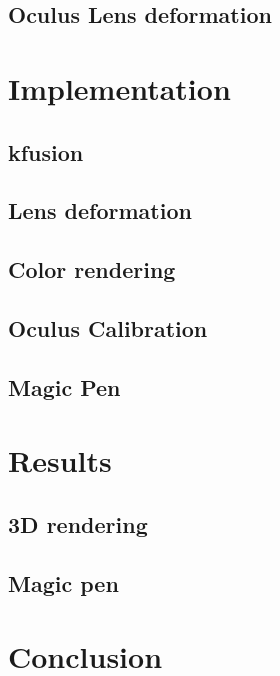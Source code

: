 \documentclass[12pt]{article}
\begin{document}
\subsection{Oculus Lens deformation}

\section{Implementation}
\subsection{kfusion}
\subsection{Lens deformation}
\subsection{Color rendering}
\subsection{Oculus Calibration}
\subsection{Magic Pen}

\section{Results}
\subsection{3D rendering}
\subsection{Magic pen}

\newpage
\section*{Conclusion}

\newpage
{}
%
%
\end{document}

